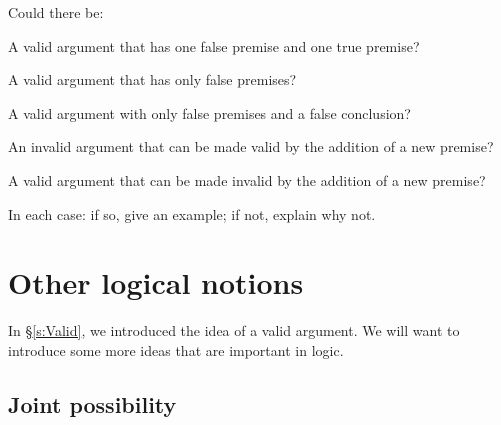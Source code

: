 \problempart
\label{pr.EnglishCombinations}
Could there be:
	\begin{earg}
		\item A valid argument that has one false premise and one true premise?
		\item A valid argument that has only false premises?
		\item A valid argument with only false premises and a false conclusion?
		\item An invalid argument that can be made valid by the addition of a new premise?
		\item A valid argument that can be made invalid by the addition of a new premise?
	\end{earg}
In each case: if so, give an example; if not, explain why not.


\chapter{Other logical notions}\label{s:BasicNotions}

In \S\ref{s:Valid}, we introduced the idea of a valid argument. We will want to introduce some more ideas that are important in logic.



\section{Joint possibility}

